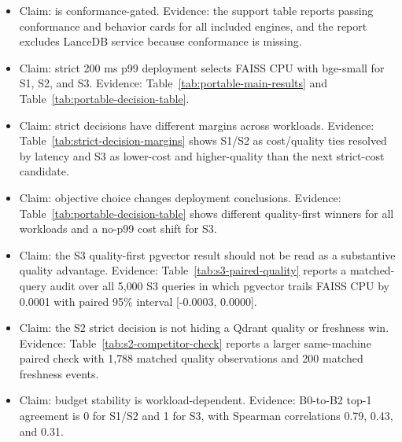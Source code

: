 

\begin{itemize}[leftmargin=*]
  \item Claim: \sys is conformance-gated. Evidence: the support table reports passing conformance and behavior cards for all included engines, and the report excludes LanceDB service because conformance is missing.
  \item Claim: strict 200 ms p99 deployment selects FAISS CPU with bge-small for S1, S2, and S3. Evidence: Table~\ref{tab:portable-main-results} and Table~\ref{tab:portable-decision-table}.
  \item Claim: strict decisions have different margins across workloads. Evidence: Table~\ref{tab:strict-decision-margins} shows S1/S2 as cost/quality ties resolved by latency and S3 as lower-cost and higher-quality than the next strict-cost candidate.
  \item Claim: objective choice changes deployment conclusions. Evidence: Table~\ref{tab:portable-decision-table} shows different quality-first winners for all workloads and a no-p99 cost shift for S3.
  \item Claim: the S3 quality-first pgvector result should not be read as a substantive quality advantage. Evidence: Table~\ref{tab:s3-paired-quality} reports a matched-query audit over all 5{,}000 S3 queries in which pgvector trails FAISS CPU by 0.0001 \ecov{} with paired 95\% interval [-0.0003, 0.0000].
  \item Claim: the S2 strict decision is not hiding a Qdrant quality or freshness win. Evidence: Table~\ref{tab:s2-competitor-check} reports a larger same-machine paired check with 1{,}788 matched quality observations and 200 matched freshness events.
  \item Claim: budget stability is workload-dependent. Evidence: B0-to-B2 top-1 agreement is 0 for S1/S2 and 1 for S3, with Spearman correlations 0.79, 0.43, and 0.31.
\end{itemize}
